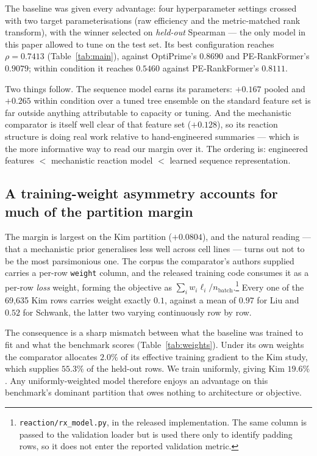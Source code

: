 \documentclass[11pt]{article}
\newcommand{\rhoS}{\rho}
\begin{document}
The baseline was given every advantage: four hyperparameter settings crossed with two
target parameterisations (raw efficiency and the metric-matched rank transform), with
the winner selected on \emph{held-out} Spearman --- the only model in this paper allowed
to tune on the test set. Its best configuration reaches $\rhoS = 0.7413$
(Table~\ref{tab:main}), against OptiPrime's $0.8690$ and PE-RankFormer's $0.9079$; within
condition it reaches $0.5460$ against PE-RankFormer's $0.8111$.

Two things follow. The sequence model earns its parameters: $+0.167$ pooled and
$+0.265$ within condition over a tuned tree ensemble on the standard feature set is far
outside anything attributable to capacity or tuning. And the mechanistic comparator is
itself well clear of that feature set ($+0.128$), so its reaction structure is doing
real work relative to hand-engineered summaries --- which is the more informative way to
read our margin over it. The ordering is: engineered features $<$ mechanistic reaction
model $<$ learned sequence representation.

\subsection{A training-weight asymmetry accounts for much of the partition margin}
\label{sec:domain-weight}

The margin is largest on the Kim partition ($+0.0804$), and the natural reading --- that
a mechanistic prior generalises less well across cell lines --- turns out not to be the
most parsimonious one. The corpus the comparator's authors supplied carries a per-row
\texttt{weight} column, and the released training code consumes it as a per-row
\emph{loss} weight, forming the objective as
$\sum_i w_i \ell_i / n_{\text{batch}}$.\footnote{\texttt{reaction/rx\_model.py}, in the
released implementation. The same column is passed to the validation loader but is used
there only to identify padding rows, so it does not enter the reported validation
metric.} Every one of the 69{,}635 Kim rows carries weight exactly $0.1$, against a mean
of $0.97$ for Liu and $0.52$ for Schwank, the latter two varying continuously row by row.

The consequence is a sharp mismatch between what the baseline was trained to fit and
what the benchmark scores (Table~\ref{tab:weights}). Under its own weights the
comparator allocates $2.0\%$ of its effective training gradient to the Kim study, which
supplies $55.3\%$ of the held-out rows. We train uniformly, giving Kim $19.6\%$. Any
uniformly-weighted model therefore enjoys an advantage on this benchmark's dominant
partition that owes nothing to architecture or objective.
\end{document}
